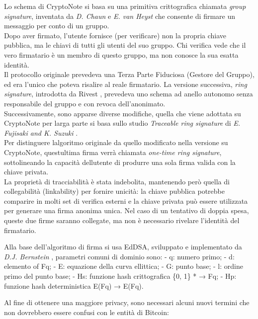 Lo schema di CryptoNote si basa su una primitiva crittografica chiamata
\emph{group signature}, inventata da \emph{D. Chaun} e \emph{E. van
Heyst} \cite{chaum_van_heyst} che consente di firmare un messaggio per conto di un
gruppo.\\
Dopo aver firmato, l'utente fornisce (per verificare) non la propria
chiave pubblica, ma le chiavi di tutti gli utenti del suo gruppo. Chi
verifica vede che il vero firmatario è un membro di questo gruppo, ma
non conosce la sua esatta identità.\\
Il protocollo originale prevedeva una Terza Parte Fiduciosa (Gestore del
Gruppo), ed era l'unico che poteva risalire al reale firmatario. La
versione successiva, \emph{ring} \emph{signature}, introdotta da Rivest
\cite{rivest_et_al} , prevedeva uno schema ad anello autonomo senza
responsabile del gruppo e con revoca dell'anonimato.\\
Successivamente, sono apparse diverse modifiche, quella che viene
adottata su CryptoNote per larga parte si basa sullo studio
\emph{Traceable ring signature} di \emph{E. Fujisaki and K. Suzuki}
\cite{fujisaki_suzuki}.\\
Per distinguere l\textquotesingle algoritmo originale da quello
modificato nella versione su CryptoNote, quest\textquotesingle ultima
firma verrà chiamata \emph{one-time ring signature}, sottolineando la
capacità dell\textquotesingle utente di produrre una sola firma valida
con la chiave privata.\\
La proprietà di tracciabilità è stata indebolita, mantenendo però quella
di collegabilità (linkability) per fornire unicità: la chiave pubblica
potrebbe comparire in molti set di verifica esterni e la chiave privata
può essere utilizzata per generare una firma anonima unica. Nel caso di
un tentativo di doppia spesa, queste due firme saranno collegate, ma non
è necessario rivelare l'identità del firmatario.

Alla base dell'algoritmo di firma si usa EdDSA, sviluppato e
implementato da \emph{D.J. Bernstein} \cite{bernstein_et_al}, parametri comuni di
dominio sono: - q: numero primo; - d: elemento of Fq; - E: equazione
della curva ellittica; - G: punto base; - l: ordine primo del punto
base; - Hs: funzione hash crittografica \{0, 1\} * → Fq; - Hp: funzione
hash deterministica E(Fq) → E(Fq).

Al fine di ottenere una maggiore privacy, sono necessari alcuni nuovi
termini che non dovrebbero essere confusi con le entità di Bitcoin:


